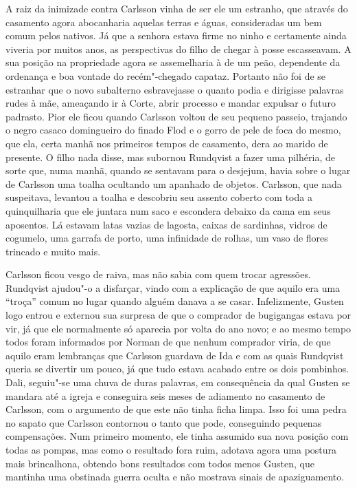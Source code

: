 A raiz da inimizade contra Carlsson vinha de ser ele um estranho, que através
do casamento agora abocanharia aquelas terras e águas, consideradas um bem 
comum pelos nativos. Já que a senhora estava firme no ninho e certamente
ainda viveria por muitos anos, as perspectivas do filho de chegar à posse
escasseavam. A sua posição na propriedade agora se assemelharia à de um peão,
dependente da ordenança e boa vontade do recém"-chegado capataz. Portanto não foi
de se estranhar que o novo subalterno esbravejasse o quanto podia e dirigisse
palavras rudes à mãe, ameaçando ir à Corte, abrir processo e mandar expulsar o
futuro padrasto. Pior ele ficou quando Carlsson voltou de seu pequeno passeio,
trajando o negro casaco domingueiro do finado Flod e o gorro de pele de foca
do mesmo, que ela, certa manhã nos primeiros tempos de casamento, dera ao marido de presente. O
filho nada disse, mas subornou Rundqvist a fazer uma pilhéria, de sorte que,
numa manhã, quando se sentavam para o desjejum, havia sobre o lugar de Carlsson
uma toalha ocultando um apanhado de objetos. Carlsson, que nada suspeitava,
levantou a toalha e descobriu seu assento coberto com toda a quinquilharia que
ele juntara num saco e escondera debaixo da cama em seus aposentos. Lá estavam
latas vazias de lagosta, caixas de sardinhas, vidros de cogumelo, uma garrafa de
porto, uma infinidade de rolhas, um vaso de flores trincado e muito mais.

Carlsson ficou vesgo de raiva, mas não sabia com quem trocar agressões.
Rundqvist ajudou"-o a disfarçar, vindo com a explicação de que aquilo era uma
``troça'' comum no lugar quando alguém danava a se casar. Infelizmente, Gusten
logo entrou e externou sua surpresa de que o comprador de bugigangas estava por
vir, já que ele normalmente só aparecia por volta do ano novo; e ao mesmo tempo todos
foram informados por Norman de que nenhum comprador viria, de que aquilo eram
lembranças que Carlsson guardava de Ida e com as quais Rundqvist queria se
divertir um pouco, já que tudo estava acabado entre os dois pombinhos. Dali,
seguiu"-se uma chuva de duras palavras, em consequência da qual Gusten se mandara até
a igreja e conseguira seis meses de adiamento no casamento de Carlsson, com o
argumento de que este não tinha ficha limpa. Isso foi uma pedra no sapato que
Carlsson contornou o tanto que pode, conseguindo pequenas compensações. Num
primeiro momento, ele tinha assumido sua nova posição com todas as pompas, mas
como o resultado fora ruim, adotava agora uma postura mais brincalhona,
obtendo bons resultados com todos menos Gusten, que mantinha uma obstinada
guerra oculta e não mostrava sinais de apaziguamento.

